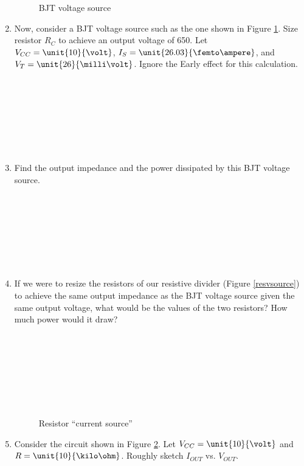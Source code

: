 \documentclass{article}
\begin{document}
\begin{enumerate}
		\begin{figure}[!htb]
			
			\centerline{\box\graph}
			\caption{BJT voltage source}
			\label{bjtvsource}
		\end{figure}
	\item Now, consider a BJT voltage source such as the one shown in Figure \ref{bjtvsource}. Size resistor $R_C$ to achieve an output voltage of \unit{650}{\milli\volt}. Let $V_{CC} = \unit{10}{\volt}$, $I_{S} = \unit{26.03}{\femto\ampere}$, and $V_{T} = \unit{26}{\milli\volt}$. Ignore the Early effect for this calculation.
	\\~\\~\\~\\~\\~\\~\\~\\
	\item Find the output impedance and the power dissipated by this BJT voltage source. 
	\\~\\~\\~\\~\\~\\~\\~\\
	\item If we were to resize the resistors of our resistive divider (Figure \ref{resvsource}) to achieve the same output impedance as the BJT voltage source given the same output voltage, what would be the values of the two resistors? How much power would it draw?
	\\~\\~\\~\\~\\~\\~\\~\\
	
	\begin{figure}[!htb]
		
		\centerline{\box\graph}
		\caption{Resistor ``current source''}
		\label{lab6_csource3}
	\end{figure}
	\item Consider the circuit shown in Figure \ref{lab6_csource3}. Let $V_{CC} = \unit{10}{\volt}$ and $R = \unit{10}{\kilo\ohm}$. Roughly sketch $I_{OUT}$ vs. $V_{OUT}$.


\end{enumerate}
\end{document}
